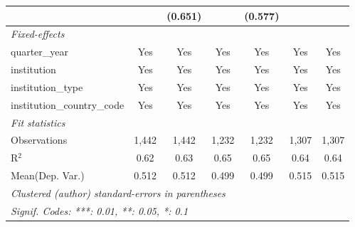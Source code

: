 \begin{tabular}{lcccccc}
                                      &             & (0.651)      &         & (0.577)     &              &   \\   
   \midrule
   \emph{Fixed-effects}\\
   quarter\_year                      & Yes         & Yes          & Yes     & Yes         & Yes          & Yes\\  
   institution                        & Yes         & Yes          & Yes     & Yes         & Yes          & Yes\\  
   institution\_type                  & Yes         & Yes          & Yes     & Yes         & Yes          & Yes\\  
   institution\_country\_code         & Yes         & Yes          & Yes     & Yes         & Yes          & Yes\\  
   \midrule
   \emph{Fit statistics}\\
   Observations                       & 1,442       & 1,442        & 1,232   & 1,232       & 1,307        & 1,307\\  
   R$^2$                              & 0.62        & 0.63         & 0.65    & 0.65        & 0.64         & 0.64\\  
Mean(Dep. Var.) & 0.512 & 0.512 & 0.499 & 0.499 & 0.515 & 0.515 \\
   \midrule \midrule
   \multicolumn{7}{l}{\emph{Clustered (author) standard-errors in parentheses}}\\
   \multicolumn{7}{l}{\emph{Signif. Codes: ***: 0.01, **: 0.05, *: 0.1}}\\
\end{tabular}
\par\endgroup
